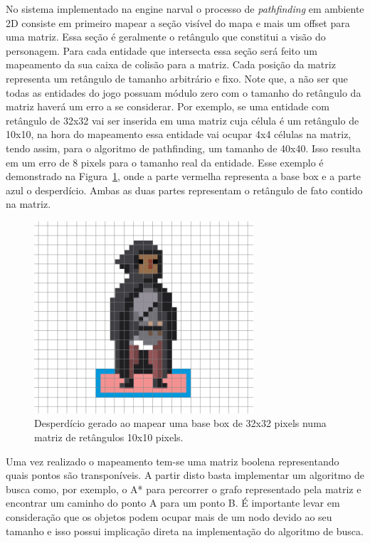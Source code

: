 \documentclass[12pt, 
openright, 
oneside, 
a4paper,    
brazil]{facom-ufu-abntex2}
\begin{document}
No sistema implementado na engine narval o processo de \textit{pathfinding} em ambiente 2D consiste em primeiro mapear a seção visível do mapa e mais um offset para uma matriz. Essa seção é geralmente o retângulo que constitui a visão do personagem. Para cada entidade que intersecta essa seção será feito um mapeamento da sua caixa de colisão para a matriz. Cada posição da matriz representa um retângulo de tamanho arbitrário e fixo. Note que, a não ser que todas as entidades do jogo possuam módulo zero com o tamanho do retângulo da matriz haverá um erro a se considerar. Por exemplo, se uma entidade com retângulo de 32x32 vai ser inserida em uma matriz cuja célula é um retângulo de 10x10, na hora do mapeamento essa entidade vai ocupar 4x4 células na matriz, tendo assim, para o algoritmo de pathfinding, um tamanho de 40x40. Isso resulta em um erro de 8 pixels para o tamanho real da entidade. Esse exemplo é demonstrado na Figura~\ref{fig:pixelWaste}, onde a parte vermelha representa a base box e a parte azul o desperdício. Ambas as duas partes representam o retângulo de fato contido na matriz.

\begin{figure}[H]
	\centering
	\includegraphics[width=22em]{imagens/pixelWaste.png}
	\caption{Desperdício gerado ao mapear uma base box de 32x32 pixels numa matriz de retângulos 10x10 pixels.}
	\label{fig:pixelWaste}
\end{figure}


Uma vez realizado o mapeamento tem-se uma matriz boolena representando quais pontos são transponíveis. A partir disto basta implementar um algoritmo de busca como, por exemplo, o A* para percorrer o grafo representado pela matriz e encontrar um caminho do ponto A para um ponto B. É importante levar em consideração que os objetos podem ocupar mais de um nodo devido ao seu tamanho e isso possui implicação direta na implementação do algoritmo de busca.
\end{document}
